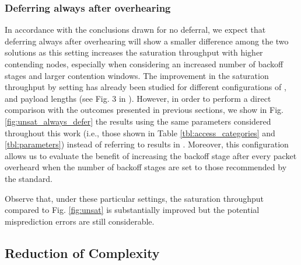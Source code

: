 \documentclass[preprint,12pt]{elsarticle}
\begin{document}
\subsubsection{Deferring always after overhearing }

In accordance with the conclusions drawn for no deferral, we expect that deferring always after overhearing will show a smaller difference among the two solutions as this setting increases the saturation throughput with higher contending nodes, especially when considering an increased number of backoff stages and larger contention windows. The improvement in the saturation throughput by setting  has already been studied for different configurations of ,  and payload lengths (see Fig. 3 in \cite{campista2005improving}). However, in order to perform a direct comparison with the outcomes presented in previous sections, we show in Fig. \ref{fig:unsat_always_defer} the results using the same parameters considered throughout this work (i.e., those shown in Table \ref{tbl:access_categories} and \ref{tbl:parameters}) instead of referring to results in \cite{campista2005improving}. Moreover, this configuration allows us to evaluate the benefit of increasing the backoff stage after every packet overheard when the number of backoff stages are set to those recommended by the standard.

Observe that, under these particular settings, the saturation throughput compared to Fig. \ref{fig:unsat} is substantially improved but the potential misprediction errors are still considerable. 

\subsection{Reduction of Complexity}
\end{document}
